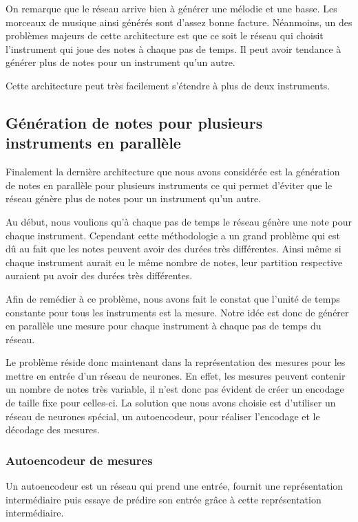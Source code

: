 On remarque que le réseau arrive bien à générer une mélodie et une basse. Les morceaux de musique ainsi générés sont d'assez bonne facture. Néanmoins, un des problèmes majeurs de cette architecture est que ce soit le réseau qui choisit l'instrument qui joue des notes à chaque pas de temps. Il peut avoir tendance à générer plus de notes pour un instrument qu'un autre.

Cette architecture peut très facilement s'étendre à plus de deux instruments.

\subsection{Génération de notes pour plusieurs instruments en parallèle}

Finalement la dernière architecture que nous avons considérée est la génération de notes en parallèle pour plusieurs instruments ce qui permet d'éviter que le réseau génère plus de notes pour un instrument qu'un autre.

Au début, nous voulions qu'à chaque pas de temps le réseau génère une note pour chaque instrument. Cependant cette méthodologie a un grand problème qui est dû au fait que les notes peuvent avoir des durées très différentes. Ainsi même si chaque instrument aurait eu le même nombre de notes, leur partition respective auraient pu avoir des durées très différentes.

Afin de remédier à ce problème, nous avons fait le constat que l'unité de temps constante pour tous les instruments est la mesure. Notre idée est donc de générer en parallèle une mesure pour chaque instrument à chaque pas de temps du réseau.

Le problème réside donc maintenant dans la représentation des mesures pour les mettre en entrée d'un réseau de neurones. En effet, les mesures peuvent contenir un nombre de notes très variable, il n'est donc pas évident de créer un encodage de taille fixe pour celles-ci. La solution que nous avons choisie est d'utiliser un réseau de neurones spécial, un autoencodeur, pour réaliser l'encodage et le décodage des mesures.

\subsubsection{Autoencodeur de mesures}

Un autoencodeur est un réseau qui prend une entrée, fournit une représentation intermédiaire puis essaye de prédire son entrée grâce à cette représentation intermédiaire.

